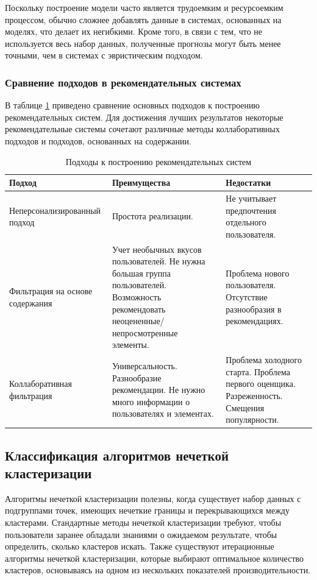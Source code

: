 Поскольку построение модели часто является трудоемким и ресурсоемким процессом, обычно сложнее добавлять данные в системах, основанных на моделях, что делает их негибкими. Кроме того, в связи с тем, что не используется весь набор данных, полученные прогнозы могут быть менее точными, чем в системах с эвристическим подходом.


\subsubsection{Сравнение подходов в рекомендательных системах}
В таблице \ref{recs_table} приведено сравнение основных подходов к построению рекомендательных систем. Для достижения лучших результатов некоторые рекомендательные системы сочетают различные методы коллаборативных подходов и подходов, основанных на содержании.

\begin{table}[H]
	\caption{Подходы к построению рекомендательных систем}
	\label{recs_table}
	\begin{center}
		\begin{tabularx}{1\textwidth}{ 
				| >{\raggedright\arraybackslash}X 
				| >{\centering\arraybackslash}X 
				| >{\centering\arraybackslash}X | }
			\hline
			Подход & Преимущества & Недостатки \\ 
			\hline
			Неперсонализированный подход & Простота реализации. & Не учитывает предпочтения отдельного пользователя. \\ 
			\hline
			Фильтрация на основе содержания & Учет необычных вкусов пользователей. Не нужна большая группа пользователей. Возможность рекомендовать неоцененные/непросмотренные элементы. & Проблема нового пользователя. Отсутствие разнообразия в рекомендациях. \\ 
			\hline
			Коллаборативная фильтрация & Универсальность. Разнообразие рекомендации. Не нужно много информации о пользователях и элементах. & Проблема холодного старта. Проблема первого оценщика. Разреженность. Смещения популярности. \\
			\hline
		\end{tabularx}
	\end{center}
\end{table}

\subsection{Классификация алгоритмов нечеткой кластеризации}

Алгоритмы нечеткой кластеризации полезны, когда существует набор данных с подгруппами точек, имеющих нечеткие границы и перекрывающихся между кластерами. Стандартные методы нечеткой кластеризации требуют, чтобы пользователи заранее обладали знаниями о ожидаемом результате, чтобы определить, сколько кластеров искать. Также существуют итерационные алгоритмы нечеткой кластеризации, которые выбирают оптимальное количество кластеров, основываясь на одном из нескольких показателей производительности. \cite{FuzzyComp}

